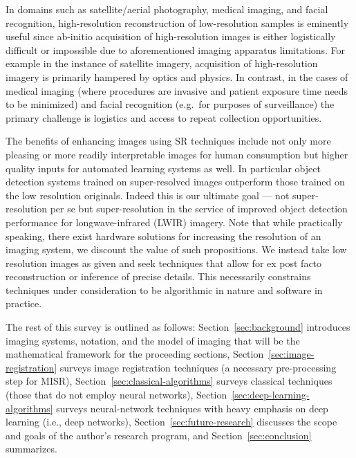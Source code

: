 In domains such as satellite/aerial photography, medical imaging, and facial recognition,
high-resolution reconstruction of low-resolution samples is eminently useful since ab-initio acquisition of high-resolution images is either logistically difficult or impossible due to aforementioned imaging apparatus limitations.
%
For example in the instance of satellite imagery, acquisition of high-resolution imagery is primarily hampered by optics and physics.
%
In contrast, in the cases of medical imaging (where procedures are invasive and patient exposure time needs to be minimized\cite{doi:10.1002.cmr.a.21249}) and facial recognition (e.g.\ for purposes of surveillance) the primary challenge is logistics and access to repeat collection opportunities.

The benefits of enhancing images using SR techniques include not only more pleasing or more readily interpretable images for human consumption but higher quality inputs for automated learning systems as well.
%
In particular object detection systems trained on super-resolved images outperform those trained on the low
resolution originals\cite{effectssuperres}.
%
Indeed this is our ultimate goal --- not super-resolution per se but super-resolution in the service of improved object detection performance for longwave-infrared (LWIR) imagery.
%
Note that while practically speaking, there exist hardware solutions for increasing the resolution of an imaging
system, we discount the value of such propositions.
%
We instead take low resolution images as given and seek techniques that allow for ex post facto reconstruction or inference of precise details.
%
This necessarily constrains techniques under consideration to be algorithmic in nature and software in practice.

The rest of this survey is outlined as follows: Section~\ref{sec:background} introduces imaging systems, notation, and the model of imaging that will be the mathematical framework for the proceeding sections, Section~\ref{sec:image-registration} surveys image registration techniques (a necessary pre-processing step for MISR), Section~\ref{sec:classical-algorithms} surveys classical techniques (those that do not employ neural networks), Section~\ref{sec:deep-learning-algorithms} surveys neural-network techniques with heavy emphasis on deep learning (i.e., deep networks), Section~\ref{sec:future-research} discusses the scope and goals of the author's research program, and Section~\ref{sec:conclusion} summarizes.
